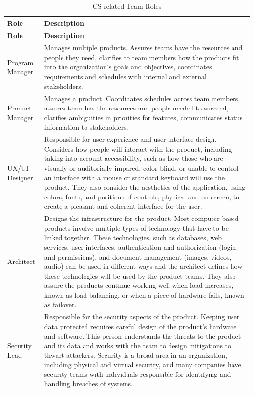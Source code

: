 \newcommand\Tstrut{\rule{0pt}{15pt}}  %


\begin{longtable}[!htb]{p{.8in}|p{3.6in}}
	\caption{CS-related Team Roles}
	\label{tab:table1}\\
	\textbf{Role} & \textbf{Description}\\
	\hline
	\endfirsthead
	\textbf{Role} & \textbf{Description}\\
	\endhead
	\Tstrut Program Manager & Manages multiple products. Assures teams have the resources and people they need, clarifies to team members how the products fit into the organization's goals and objectives, coordinates requirements and schedules with internal and external stakeholders.\\
	\hline
	\Tstrut Product Manager & Manages a product. Coordinates schedules across team members, assures team has the resources and people needed to succeed, clarifies ambiguities in priorities for features, communicates status information to stakeholders.\\
	\hline
	\Tstrut UX/UI \linebreak Designer & Responsible for user experience and user interface design. Considers how people will interact with the product, including taking into account accessibility, such as how those who are visually or auditorially impared, color blind, or unable to control an interface with a mouse or standard keyboard will use the product. They also consider the aesthetics of the application, using colors, fonts, and positions of controls, physical and on screen, to create a pleasant and coherent interface for the user.\\
	\hline
	\Tstrut Architect & Designs the infrastructure for the product. Most computer-based products involve multiple types of technology that have to be linked together. These technologies, such as databases, web services, user interfaces, authentication and authorization (login and permissions), and document management (images, videos, audio) can be used in different ways and the architect defines how these technologies will be used by the product teams. They also assure the products continue working well when load increases, known as load balancing, or when a piece of hardware fails, known as failover.\\
	\hline
	\Tstrut Security Lead & Responsible for the security aspects of the product. Keeping user data protected requires careful design of the product's hardware and software. This person understands the threats to the product and its data and works with the team to design mitigations to thwart attackers. Security is a broad area in an organization, including physical and virtual security, and many companies have security teams with individuals responsible for identifying and handling breaches of systems.\\

\end{longtable}
